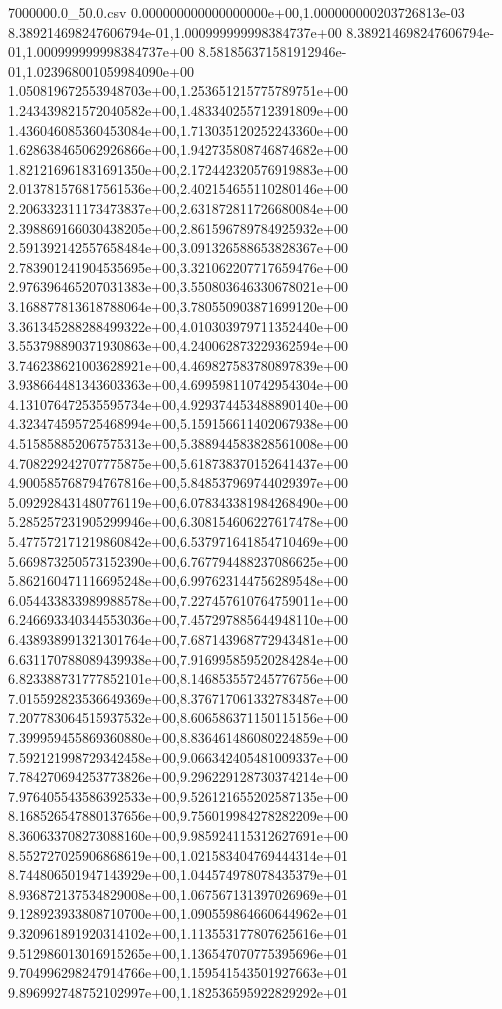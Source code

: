 \begin{filecontents*}{7000000.0_50.0.csv}
0.000000000000000000e+00,1.000000000203726813e-03
8.389214698247606794e-01,1.000999999998384737e+00
8.389214698247606794e-01,1.000999999998384737e+00
8.581856371581912946e-01,1.023968001059984090e+00
1.050819672553948703e+00,1.253651215775789751e+00
1.243439821572040582e+00,1.483340255712391809e+00
1.436046085360453084e+00,1.713035120252243360e+00
1.628638465062926866e+00,1.942735808746874682e+00
1.821216961831691350e+00,2.172442320576919883e+00
2.013781576817561536e+00,2.402154655110280146e+00
2.206332311173473837e+00,2.631872811726680084e+00
2.398869166030438205e+00,2.861596789784925932e+00
2.591392142557658484e+00,3.091326588653828367e+00
2.783901241904535695e+00,3.321062207717659476e+00
2.976396465207031383e+00,3.550803646330678021e+00
3.168877813618788064e+00,3.780550903871699120e+00
3.361345288288499322e+00,4.010303979711352440e+00
3.553798890371930863e+00,4.240062873229362594e+00
3.746238621003628921e+00,4.469827583780897839e+00
3.938664481343603363e+00,4.699598110742954304e+00
4.131076472535595734e+00,4.929374453488890140e+00
4.323474595725468994e+00,5.159156611402067938e+00
4.515858852067575313e+00,5.388944583828561008e+00
4.708229242707775875e+00,5.618738370152641437e+00
4.900585768794767816e+00,5.848537969744029397e+00
5.092928431480776119e+00,6.078343381984268490e+00
5.285257231905299946e+00,6.308154606227617478e+00
5.477572171219860842e+00,6.537971641854710469e+00
5.669873250573152390e+00,6.767794488237086625e+00
5.862160471116695248e+00,6.997623144756289548e+00
6.054433833989988578e+00,7.227457610764759011e+00
6.246693340344553036e+00,7.457297885644948110e+00
6.438938991321301764e+00,7.687143968772943481e+00
6.631170788089439938e+00,7.916995859520284284e+00
6.823388731777852101e+00,8.146853557245776756e+00
7.015592823536649369e+00,8.376717061332783487e+00
7.207783064515937532e+00,8.606586371150115156e+00
7.399959455869360880e+00,8.836461486080224859e+00
7.592121998729342458e+00,9.066342405481009337e+00
7.784270694253773826e+00,9.296229128730374214e+00
7.976405543586392533e+00,9.526121655202587135e+00
8.168526547880137656e+00,9.756019984278282209e+00
8.360633708273088160e+00,9.985924115312627691e+00
8.552727025906868619e+00,1.021583404769444314e+01
8.744806501947143929e+00,1.044574978078435379e+01
8.936872137534829008e+00,1.067567131397026969e+01
9.128923933808710700e+00,1.090559864660644962e+01
9.320961891920314102e+00,1.113553177807625616e+01
9.512986013016915265e+00,1.136547070775395696e+01
9.704996298247914766e+00,1.159541543501927663e+01
9.896992748752102997e+00,1.182536595922829292e+01

\end{filecontents*}
